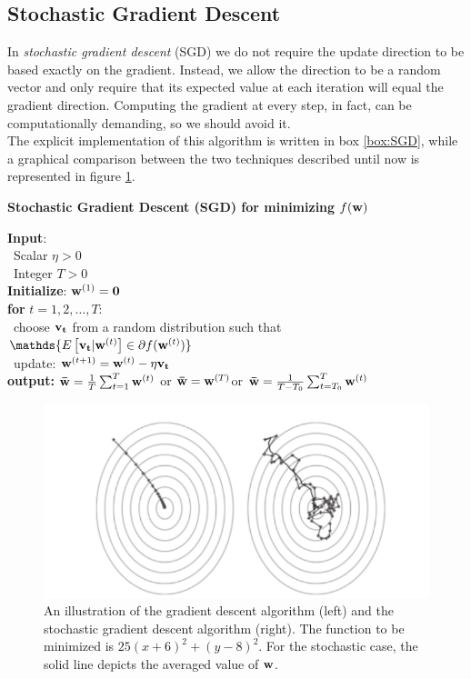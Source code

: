 \documentclass[12pt]{report}
\theoremstyle{plain}
\begin{document}
\begin{flushleft}
\section{Stochastic Gradient Descent}
In \textit{stochastic gradient descent} (SGD) we do not require the update direction to be based exactly on the gradient. Instead, we allow the direction to be a random vector and
only require that its expected value at each iteration will equal the gradient direction. Computing the gradient at every step, in fact, can be computationally demanding, so we should avoid it.\\
The explicit implementation of this algorithm is written in box \ref{box:SGD}, while a graphical comparison between the two techniques described until now is represented in figure \ref{fig:ex_GD}.

\begin{tcolorbox}
	\begin{center}
		\textbf{Stochastic Gradient Descent (SGD) for minimizing $f(\vb{w})$}
	\end{center}
	\textbf{Input}:\\
	\-\ Scalar $\eta>0$\\
	\-\ Integer $T>0$\\
	
	\textbf{Initialize}: \quad $\vb{w}^{(1)}=\vb{0}$\\
	
	\textbf{for} $t=1,2,\dots,T$:\\
	\-\ choose $\vb{v_t}$ from a random distribution such that $\mathds{E\left[\vb{v_t}|\vb{w}^{(t)} \right]\in\partial f(\vb{w}^{(t)})}$\\
	\-\ update: $\vb{w}^{(t+1)} = \vb{w}^{(t)}-\eta\vb{v_t}$ \\
	
	\textbf{output:} \qquad$\vb{\bar{w}} = \frac{1}{T}\sum_{t=1}^T \vb{w}^{(t)}$ \qquad  or \qquad $\vb{\bar{w}}=\vb{w}^{(T)}$\qquad   or  \qquad $\vb{\bar{w}} = \frac{1}{T-T_0}\sum_{t=T_0}^T\vb{w}^{(t)}$
	
	\label{box:SGD}
\end{tcolorbox}

\begin{figure}[!h]
	\centering
	\includegraphics[scale=1]{images/ex_gradient_descent.pdf}
	\caption{An illustration of the gradient descent algorithm (left) and the stochastic
		gradient descent algorithm (right). The function to be minimized is $25(x+6)^2+(y-8)^2$. For the stochastic case, the solid line depicts the averaged value of $\vb{w}$.}
	\label{fig:ex_GD}
\end{figure}


\end{flushleft}
\end{document}
